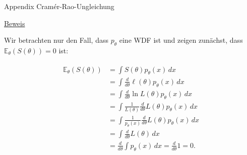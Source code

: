 \documentclass[
  8pt,
  ignorenonframetext,
]{beamer}
\begin{document}
\begin{frame}{Appendix \textbar{} Cramér-Rao-Ungleichung}
\protect\hypertarget{appendix-cramuxe9r-rao-ungleichung-6}{}
\footnotesize

\underline{Beweis}

Wir betrachten nur den Fall, dass \(p_\theta\) eine WDF ist und zeigen
zunächst, dass \(\mathbb{E}_\theta(S(\theta)) = 0\) ist:

\tiny

\begin{align}
\begin{split}
\mathbb{E}_\theta(S(\theta))
& = \int S(\theta)p_\theta(x) \,dx \\
& = \int \frac{d}{d\theta}\ell(\theta)p_\theta(x) \,dx \\
& = \int \frac{d}{d\theta} \ln L(\theta) p_\theta(x) \,dx \\
& = \int \frac{1}{L(\theta)}\frac{d}{d\theta}L(\theta) p_\theta(x) \,dx  \\
& = \int \frac{1}{p_\theta(x)}\frac{d}{d\theta}L(\theta) p_\theta(x) \,dx  \\
& = \int \frac{d}{d\theta}L(\theta) \,dx  \\
& = \frac{d}{d\theta} \int p_\theta(x)\,dx
= \frac{d}{d\theta} 1
= 0.
\end{split}
\end{align}
\end{frame}
\end{document}

